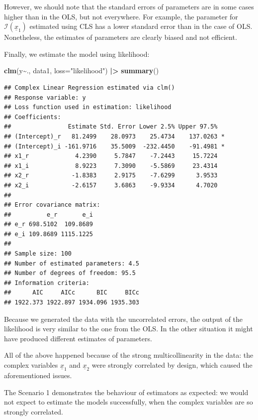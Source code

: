 \documentclass[
]{book}
\newenvironment{Shaded}{\begin{snugshade}}{\end{snugshade}}
\newcommand{\DataTypeTok}[1]{\textcolor[rgb]{0.13,0.29,0.53}{#1}}
\newcommand{\ErrorTok}[1]{\textcolor[rgb]{0.64,0.00,0.00}{\textbf{#1}}}
\newcommand{\KeywordTok}[1]{\textcolor[rgb]{0.13,0.29,0.53}{\textbf{#1}}}
\newcommand{\NormalTok}[1]{#1}
\newcommand{\OperatorTok}[1]{\textcolor[rgb]{0.81,0.36,0.00}{\textbf{#1}}}
\newcommand{\StringTok}[1]{\textcolor[rgb]{0.31,0.60,0.02}{#1}}
\begin{document}
However, we should note that the standard errors of parameters are in some cases higher than in the OLS, but not everywhere. For example, the parameter for \(\mathcal{I}\left(\underline{x}_{1}\right)\) estimated using CLS has a lower standard error than in the case of OLS. Nonetheless, the estimates of parameters are clearly biased and not efficient.

Finally, we estimate the model using likelihood:

\begin{Shaded}
\begin{Highlighting}[]
\KeywordTok{clm}\NormalTok{(y}\OperatorTok{\textasciitilde{}}\NormalTok{., data1, }\DataTypeTok{loss=}\StringTok{"likelihood"}\NormalTok{) }\OperatorTok{|}\ErrorTok{\textgreater{}}
\StringTok{    }\KeywordTok{summary}\NormalTok{()}
\end{Highlighting}
\end{Shaded}

\begin{verbatim}
## Complex Linear Regression estimated via clm()
## Response variable: y
## Loss function used in estimation: likelihood
## Coefficients:
##                Estimate Std. Error Lower 2.5% Upper 97.5%  
## (Intercept)_r   81.2499    28.0973    25.4734    137.0263 *
## (Intercept)_i -161.9716    35.5009  -232.4450    -91.4981 *
## x1_r             4.2390     5.7847    -7.2443     15.7224  
## x1_i             8.9223     7.3090    -5.5869     23.4314  
## x2_r            -1.8383     2.9175    -7.6299      3.9533  
## x2_i            -2.6157     3.6863    -9.9334      4.7020  
## 
## Error covariance matrix:
##          e_r       e_i
## e_r 698.5102  109.8689
## e_i 109.8689 1115.1225
## 
## Sample size: 100
## Number of estimated parameters: 4.5
## Number of degrees of freedom: 95.5
## Information criteria:
##      AIC     AICc      BIC     BICc 
## 1922.373 1922.897 1934.096 1935.303
\end{verbatim}

Because we generated the data with the uncorrelated errors, the output of the likelihood is very similar to the one from the OLS. In the other situation it might have produced different estimates of parameters.

All of the above happened because of the strong multicollinearity in the data: the complex variables \(\underline{x}_{1}\) and \(\underline{x}_{2}\) were strongly correlated by design, which caused the aforementioned issues.

The Scenario 1 demonstrates the behaviour of estimators as expected: we would not expect to estimate the models successfully, when the complex variables are so strongly correlated.
\end{document}
